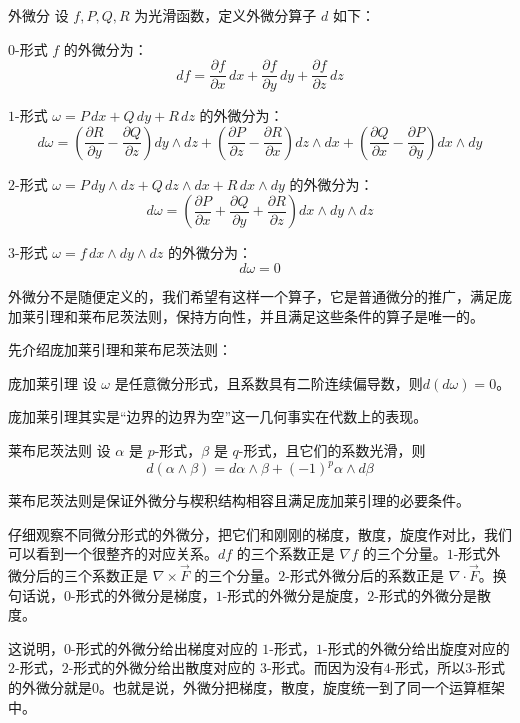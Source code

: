 \begin{definition}{外微分}{}
设 \(f,P,Q,R\) 为光滑函数，定义外微分算子 \(d\) 如下：

\(0\)-形式 \(f\) 的外微分为：
  \[
  df=\frac{\partial f}{\partial x}\,dx+\frac{\partial f}{\partial y}\,dy+\frac{\partial f}{\partial z}\,dz
  \]

  \(1\)-形式 \(\omega=P\,dx+Q\,dy+R\,dz\) 的外微分为：
  \[
  d\omega=
  \left(\frac{\partial R}{\partial y}-\frac{\partial Q}{\partial z}\right)dy\wedge dz
  +\left(\frac{\partial P}{\partial z}-\frac{\partial R}{\partial x}\right)dz\wedge dx
  +\left(\frac{\partial Q}{\partial x}-\frac{\partial P}{\partial y}\right)dx\wedge dy
  \]

  \(2\)-形式 \(\omega=P\,dy\wedge dz+Q\,dz\wedge dx+R\,dx\wedge dy\) 的外微分为：
  \[
  d\omega=
  \left(\frac{\partial P}{\partial x}+\frac{\partial Q}{\partial y}+\frac{\partial R}{\partial z}\right)
  dx\wedge dy\wedge dz
  \]

  \(3\)-形式 \(\omega=f\,dx\wedge dy\wedge dz\) 的外微分为：
  \[
  d\omega=0
  \]
\end{definition}

外微分不是随便定义的，我们希望有这样一个算子，它是普通微分的推广，满足庞加莱引理和莱布尼茨法则，保持方向性，并且满足这些条件的算子是唯一的。

先介绍庞加莱引理和莱布尼茨法则：

\begin{theorem}{庞加莱引理}{}
  设 \(\omega\) 是任意微分形式，且系数具有二阶连续偏导数，则\(d(d\omega)=0\)。

\end{theorem}
庞加莱引理其实是“边界的边界为空”这一几何事实在代数上的表现。

\begin{theorem}{莱布尼茨法则}{}
  设 \(\alpha\) 是 \(p\)-形式，\(\beta\) 是 \(q\)-形式，且它们的系数光滑，则
\[
d(\alpha\wedge\beta)=d\alpha\wedge\beta+(-1)^p\alpha\wedge d\beta
\]
\end{theorem}
莱布尼茨法则是保证外微分与楔积结构相容且满足庞加莱引理的必要条件。

仔细观察不同微分形式的外微分，把它们和刚刚的梯度，散度，旋度作对比，我们可以看到一个很整齐的对应关系。\(df\) 的三个系数正是 \(\nabla f\) 的三个分量。\(1\)-形式外微分后的三个系数正是 \(\nabla\times\vec{F}\) 的三个分量。\(2\)-形式外微分后的系数正是 \(\nabla\cdot\vec{F}\)。换句话说，\(0\)-形式的外微分是梯度，\(1\)-形式的外微分是旋度，\(2\)-形式的外微分是散度。

这说明，\(0\)-形式的外微分给出梯度对应的 \(1\)-形式，\(1\)-形式的外微分给出旋度对应的 \(2\)-形式，\(2\)-形式的外微分给出散度对应的 \(3\)-形式。而因为没有\(4\)-形式，所以\(3\)-形式的外微分就是\(0\)。也就是说，外微分把梯度，散度，旋度统一到了同一个运算框架中。

